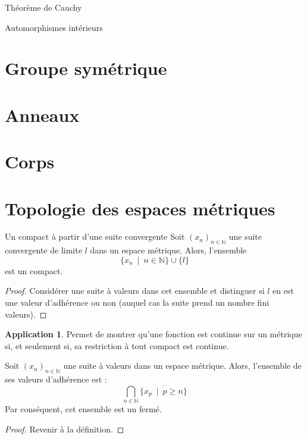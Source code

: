 \documentclass[french]{article}
\newcommand{\N}{\mathbb{N}}
\theoremstyle{theorem}
\theoremstyle{definition}
\newtheorem*{app}{Application}
\begin{document}
\begin{lem}{Théorème de Cauchy}
	
\end{lem}

\begin{lem}{Automorphismes intérieurs}
	
\end{lem}

\section{Groupe symétrique}

\section{Anneaux}

\section{Corps}

\section{Topologie des espaces métriques}

\begin{lem}{Un compact à partir d'une suite convergente}
	Soit $(x_n)_{n\in\N}$ une suite convergente de limite $l$ dans un espace métrique. Alors, l'ensemble $$\{x_n\ \mid\ n\in\N\}\cup\{l\}$$ est un compact.
\end{lem}
\begin{proof}
	Considérer une suite à valeurs dans cet ensemble et distinguer si $l$ en est une valeur d'adhérence ou non (auquel cas la suite prend un nombre fini valeurs).
\end{proof}
\begin{app}
	Permet de montrer qu'une fonction est continue sur un métrique si, et seulement si, sa restriction à tout compact est continue.
\end{app}

\begin{lem}
	Soit $(x_n)_{n\in\N}$ une suite à valeurs dans un espace métrique. Alors, l'ensemble de ses valeurs d'adhérence est : $$\bigcap_{n\in\N}\overline{\{x_p\ \mid\ p\geqslant n\}}$$ Par conséquent, cet ensemble est un fermé.
\end{lem}
\begin{proof}
	Revenir à la définition.
\end{proof}
\end{document}
